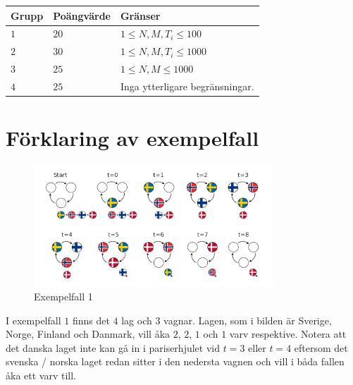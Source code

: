 \noindent
\begin{tabular}{| l | l | p{12cm} |}
  \hline
  Grupp & Poängvärde & Gränser \\ \hline
    $1$   & $20$     & $1 \leq N, M, T_i \leq 100$ \\ \hline
    $2$   & $30$     & $1 \leq N, M, T_i \leq 1000$ \\ \hline
    $3$   & $25$     & $1 \leq N, M \leq 1000$ \\ \hline
    $4$   & $25$     & Inga ytterligare begränsningar. \\ \hline
\end{tabular}


\section*{Förklaring av exempelfall}

\begin{figure}[h]
\includegraphics[width=0.8\textwidth]{sample1}
\caption{Exempelfall 1}
\end{figure}

I exempelfall $1$ finns det $4$ lag och $3$ vagnar.
Lagen, som i bilden är Sverige, Norge, Finland och Danmark, vill åka $2$, $2$, $1$ och $1$ varv respektive.
Notera att det danska laget inte kan gå in i pariserhjulet vid $t=3$ eller $t=4$
eftersom det svenska / norska laget redan sitter i den nedersta vagnen och vill i båda fallen åka ett varv till.
